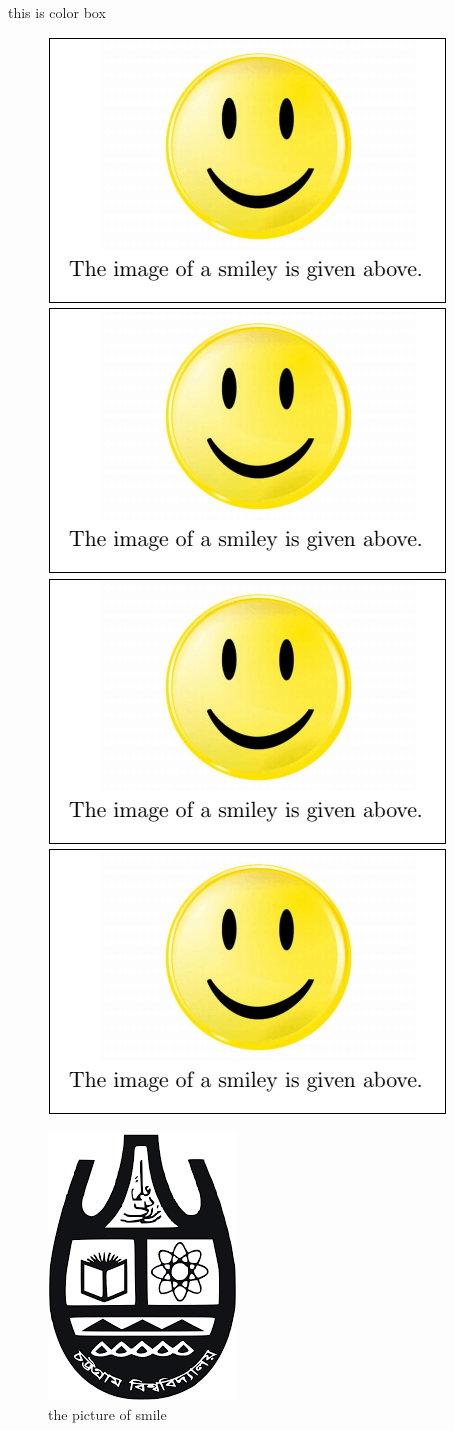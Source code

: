 \documentclass[a4paper]{article}
\begin{document}
 { this is color box} 
\begin{center}
\begin{figure}[b]



\includegraphics[width=.1\linewidth]{smile}\quad
\includegraphics[width=.1 \linewidth]{smile}\quad
\\[\baselineskip]
\includegraphics[width=.1\linewidth]{smile}\quad
\includegraphics[width=.1\linewidth]{smile}\quad

\caption{the picture of smile}





\includegraphics[scale=.1]{cse}
\end{figure}
\end{center}
\end{document}
